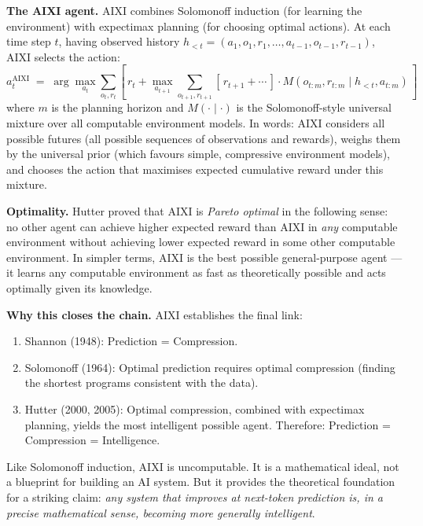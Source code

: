 \documentclass[11pt, a4paper]{article}
\begin{document}
\textbf{The AIXI agent.} AIXI combines Solomonoff induction (for learning
the environment) with expectimax planning (for choosing optimal actions).
At each time step $t$, having observed history $h_{<t} = (a_1, o_1, r_1,
\ldots, a_{t-1}, o_{t-1}, r_{t-1})$, AIXI selects the action:
\[
a_t^{\text{AIXI}} \;=\; \arg\max_{a_t} \sum_{o_t, r_t}
  \left[\, r_t + \max_{a_{t+1}} \sum_{o_{t+1}, r_{t+1}}
  \left[\, r_{t+1} + \cdots \,\right]
  \cdot M(o_{t:m}, r_{t:m} \mid h_{<t}, a_{t:m}) \,\right]
\]
where $m$ is the planning horizon and $M(\cdot \mid \cdot)$ is the
Solomonoff-style universal mixture over all computable environment
models. In words: AIXI considers all possible futures (all possible
sequences of observations and rewards), weighs them by the universal
prior (which favours simple, compressive environment models), and
chooses the action that maximises expected cumulative reward under this
mixture.

\textbf{Optimality.} Hutter proved that AIXI is \emph{Pareto optimal}
in the following sense: no other agent can achieve higher expected reward
than AIXI in \emph{any} computable environment without achieving lower
expected reward in some other computable environment. In simpler terms,
AIXI is the best possible general-purpose agent --- it learns any
computable environment as fast as theoretically possible and acts
optimally given its knowledge.

\textbf{Why this closes the chain.} AIXI establishes the final link:
\begin{enumerate}[leftmargin=2em]
  \item Shannon (1948): Prediction = Compression.
  \item Solomonoff (1964): Optimal prediction requires optimal compression
    (finding the shortest programs consistent with the data).
  \item Hutter (2000, 2005): Optimal compression, combined with
    expectimax planning, yields the most intelligent possible agent.
    Therefore: Prediction = Compression = Intelligence.
\end{enumerate}
Like Solomonoff induction, AIXI is uncomputable. It is a mathematical
ideal, not a blueprint for building an AI system. But it provides the
theoretical foundation for a striking claim: \emph{any system that
improves at next-token prediction is, in a precise mathematical sense,
becoming more generally intelligent}.
\end{document}
